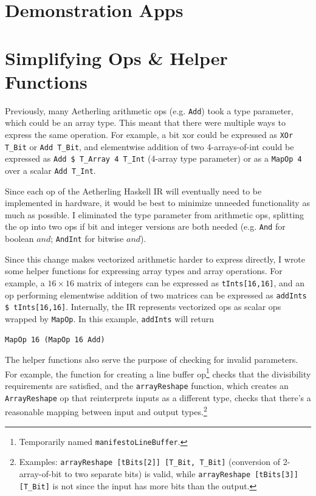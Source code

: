 \documentclass[12pt]{article}
\begin{document}
\section{Demonstration Apps}


\section{Simplifying Ops \& Helper Functions}

Previously, many Aetherling arithmetic ops (e.g. \texttt{Add}) took a
type parameter, which could be an array type. This meant that there
were multiple ways to express the same operation. For example, a bit
xor could be expressed as \texttt{XOr T\_Bit} or \texttt{Add T\_Bit},
and elementwise addition of two 4-arrays-of-int could be expressed as
\texttt{Add \$ T\_Array 4 T\_Int} (4-array type parameter) or as a
\texttt{MapOp 4} over a scalar \texttt{Add T\_Int}.

Since each op of the Aetherling Haskell IR will eventually need to be
implemented in hardware, it would be best to minimize unneeded
functionality as much as possible. I eliminated the type parameter
from arithmetic ops, splitting the op into two ops if bit and integer
versions are both needed (e.g. \texttt{And} for boolean $and$;
\texttt{AndInt} for bitwise $and$).

Since this change makes vectorized arithmetic harder to express
directly, I wrote some helper functions for expressing array types and
array operations. For example, a $16\times 16$ matrix of integers can
be expressed as \texttt{tInts[16,16]}, and an op performing
elementwise addition of two matrices can be expressed as
\texttt{addInts \$ tInts[16,16]}. Internally, the IR represents
vectorized ops as scalar ops wrapped by \texttt{MapOp}.
In this example, \texttt{addInts} will return

\texttt{MapOp 16 (MapOp 16 Add)}

The helper functions also serve the purpose of checking for invalid
parameters. For example, the function for creating a line buffer
op\footnote{Temporarily named \texttt{manifestoLineBuffer}.} checks that the
divisibility requirements are satisfied, and the \texttt{arrayReshape}
function, which creates an \texttt{ArrayReshape} op that reinterprets
inputs as a different type, checks that there's a reasonable mapping
between input and output types.\footnote{
Examples: \texttt{arrayReshape [tBits[2]] [T\_Bit, T\_Bit]} (conversion of
2-array-of-bit to two separate bits) is valid, while
\texttt{arrayReshape [tBits[3]] [T\_Bit]} is not since the input has
more bits than the output.}
\end{document}
